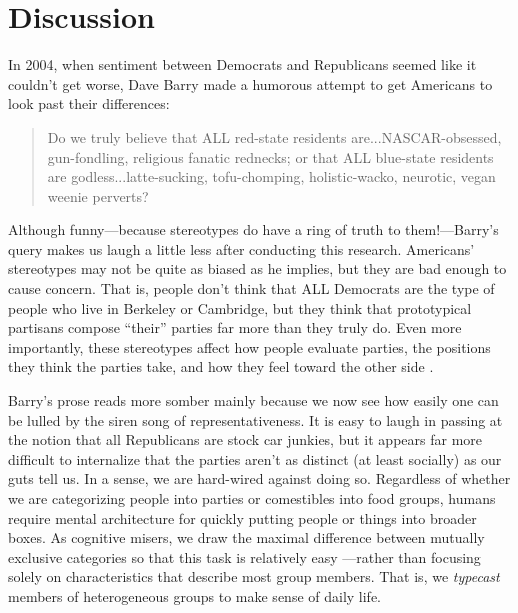 \documentclass[12pt, letterpaper]{article}
\begin{document}
\section{Discussion}

In 2004, when sentiment between Democrats and Republicans seemed like it couldn't get worse, Dave Barry made a humorous attempt to get Americans to look past their differences: \nocite{barry2004nyt}
\begin{quotation}
\noindent Do we truly believe that ALL red-state residents are...NASCAR-obsessed, gun-fondling, religious fanatic rednecks; or that ALL blue-state residents are godless...latte-sucking, tofu-chomping, holistic-wacko, neurotic, vegan weenie perverts?
\end{quotation}
\noindent Although funny---because stereotypes do have a ring of truth to them!---Barry's query makes us laugh a little less after conducting this research. Americans' stereotypes may not be quite as biased as he implies, but they are bad enough to cause concern. That is, people don't think that ALL Democrats are the type of people who live in Berkeley or Cambridge, but they think that prototypical partisans compose ``their'' parties far more than they truly do. Even more importantly, these stereotypes affect how people evaluate parties, the positions they think the parties take, and how they feel toward the other side \citep{ahler2018parties}. 

Barry's prose reads more somber mainly because we now see how easily one can be lulled by the siren song of representativeness. It is easy to laugh in passing at the notion that all Republicans are stock car junkies, but it appears far more difficult to internalize that the parties aren't as distinct (at least socially) as our guts tell us. In a sense, we are hard-wired against doing so. Regardless of whether we are categorizing people into parties or comestibles into food groups, humans require mental architecture for quickly putting people or things into broader boxes. As cognitive misers, we draw the maximal difference between mutually exclusive categories so that this task is relatively easy \citep{RoschMervis1975}---rather than focusing solely on characteristics that describe most group members. That is, we \emph{typecast} members of heterogeneous groups to make sense of daily life.
\end{document}
